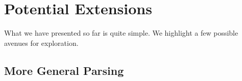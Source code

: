 \documentclass[12pt]{article}
\begin{document}








\section{Potential Extensions}

What we have presented so far is quite simple. We highlight a few
possible avenues for exploration.

\subsection{More General Parsing}
\end{document}

